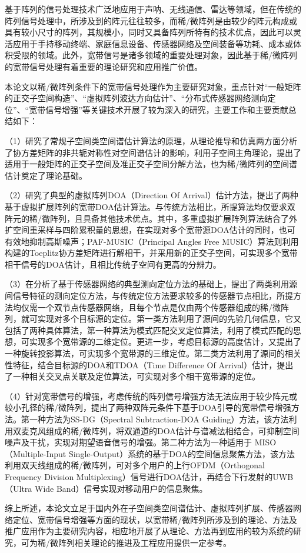 \begin{CHSabstract}
	基于阵列的信号处理技术广泛地应用于声呐、无线通信、雷达等领域，但在传统的阵列信号处理中，所涉及到的阵元往往较多，而稀/微阵列是由较少的阵元构成或具有较小尺寸的阵列，其规模小，同时又具备阵列所特有的技术优点，因此可以灵活应用于手持移动终端、家庭信息设备、传感器网络及空间装备等功耗、成本或体积受限的领域。此外，宽带信号是诸多领域的重要处理对象，因此基于稀/微阵列的宽带信号处理有着重要的理论研究和应用推广价值。


	本论文以稀/微阵列条件下的宽带信号处理作为主要研究对象，重点针对“一般矩阵的正交子空间构造”、“虚拟阵列波达方向估计”、“分布式传感器网络测向定位”、“宽带信号增强”等关键技术开展了较为深入的研究，主要工作和主要贡献总结如下：



	（1）研究了常规子空间类空间谱估计算法的原理，从理论推导和仿真两方面分析了协方差矩阵的非共轭对称性对空间谱估计的影响，利用子空间主角理论，提出了适用于一般矩阵的正交子空间及准正交子空间分解方法，也为稀/微阵列的空间谱估计奠定了理论基础。


	（2）研究了典型的虚拟阵列DOA（Direction Of Arrival）估计方法，提出了两种基于虚拟扩展阵列的宽带DOA估计算法。与传统方法相比，所提算法均仅要求双阵元的稀/微阵列，且具备其他技术优点。其中，多重虚拟扩展阵列算法结合了外扩空间重采样与四阶累积量的思想，在实现对多个宽带源DOA估计的同时，也可有效地抑制高斯噪声；PAF-MUSIC（Principal Angles Free MUSIC）算法则利用构建的Toeplitz协方差矩阵进行解相干，并采用新的正交子空间，可实现多个宽带相干信号的DOA估计，且相比传统子空间有更高的分辨力。


	（3）在分析了基于传感器网络的典型测向定位方法的基础上，提出了两类利用源间信号特征的测向定位方法，与传统定位方法要求较多的传感器节点相比，所提方法均仅需一个双节点传感器网络，且每个节点是仅由两个传感器组成的稀/微阵列，就可实现对多个目标源的定位。第一类方法利用了源间的先验几何信息，它又包括了两种具体算法，第一种算法为模式匹配交叉定位算法，利用了模式匹配的思想，可实现多个宽带源的二维定位。更进一步，考虑目标源的高度估计，又提出了一种旋转投影算法，可实现多个宽带源的三维定位。第二类方法利用了源间的相关性特征，结合目标源的DOA和TDOA（Time Difference Of Arrival）估计，提出了一种相关交叉点关联及定位算法，可实现对多个相干宽带源的定位。


	（4）针对宽带信号的增强，考虑传统的阵列信号增强方法无法应用于较少阵元或较小孔径的稀/微阵列，提出了两种双阵元条件下基于DOA引导的宽带信号增强方法。第一种方法为SS-DG（Spectral Subtraction-DOA Guiding）方法，该方法利用双麦克风组成的稀/微阵列，将双通道的DOA估计与谱减法相结合，可抑制空间噪声及干扰，实现对期望语音信号的增强。第二种方法为一种适用于 MISO（Multiple-Input Single-Output）系统的基于DOA的空间信息聚焦方法，该方法利用双天线组成的稀/微阵列，可对多个用户的上行OFDM（Orthogonal Frequency Division Multiplexing）信号进行DOA估计，再结合下行发射的UWB（Ultra Wide Band）信号实现对移动用户的信息聚焦。


	综上所述，本论文立足于国内外在子空间类空间谱估计、虚拟阵列扩展、传感器网络定位、宽带信号增强等方面的现状，以宽带稀/微阵列所涉及到的理论、方法及推广应用作为主要研究内容，相应地开展了从理论、方法再到应用的较为系统的研究，可为稀/微阵列相关理论的推进及工程应用提供一定参考。

\end{CHSabstract}
